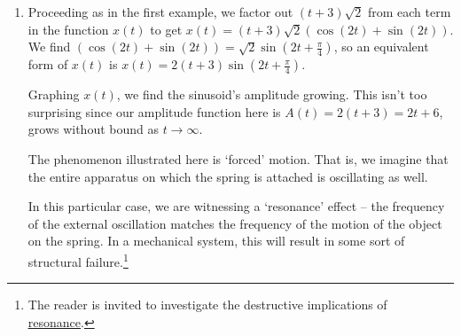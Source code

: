 \documentclass{ximera}
\begin{document}
\begin{example}
\begin{enumerate}
Indeed, if we graph $x = \pm 10e^{-t/5}$ along with $x(t) = 10e^{-t/5} \sin\left(t + \frac{\pi}{3}\right)$, we see this attenuation taking place with the exponentials acting as a `wave envelope.'  

\begin{center}
\end{center}

In this case, the function $x(t)$  corresponds to the motion of an object on a spring where there is a slight force which acts to `damp', or slow the motion.  An example of this kind of force would be the friction of the object against the air. According to  this model, the object oscillates forever, but with increasingly smaller and smaller amplitude.  This motion is often described as \textbf{underdamped} motion.


\item  Proceeding as in the first example, we factor out $(t+3)\sqrt{2}$ from each term in the function $x(t)$ to get $x(t) = (t+3)\sqrt{2}(\cos(2t) + \sin(2t))$.   We find $(\cos(2t) + \sin(2t)) = \sqrt{2} \sin\left(2t + \frac{\pi}{4}\right)$, so an equivalent form of $x(t)$ is  $x(t) = 2(t+3) \sin\left(2t + \frac{\pi}{4}\right)$.  

 

Graphing $x(t)$, we find the sinusoid's amplitude growing.  This isn't too surprising  since our amplitude function here is $A(t) = 2(t+3) = 2t+6$, grows without bound as $t \rightarrow \infty$.  

\begin{center}
\end{center}

The phenomenon illustrated here is `forced' motion.  That is, we imagine that the entire apparatus on which the spring is attached is oscillating as well.  

 

In this particular case, we are witnessing a `resonance' effect -- the frequency of the external oscillation matches the frequency of the motion of the object on the spring. In a mechanical system, this will result in some sort of structural failure.\footnote{The reader is invited to investigate the destructive implications of \href{http://en.wikipedia.org/wiki/Resonance}{\underline{resonance}}.}






\end{enumerate}
\end{example}
\end{document}

